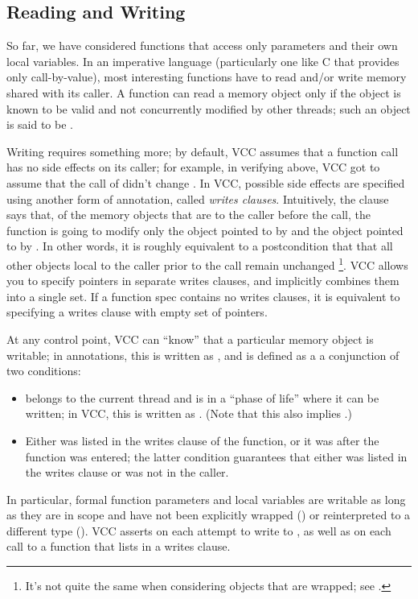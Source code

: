\subsection*{Reading and Writing}
\label{sect:writes}

So far, we have considered functions that access only parameters and
their own local variables. In an imperative language (particularly one
like C that provides only call-by-value), most interesting functions
have to read and/or write memory shared with its caller. A function
can read a memory object only if the object is known to be valid and
not concurrently modified by other threads; such an object is said to
be . 

Writing requires something more; by default, VCC assumes that a
function call has no side effects on its caller; for example, in
verifying  above, VCC got to assume that the call of
 didn't change . 
In VCC, possible side effects are specified using 
another form of annotation, called \emph{writes clauses}.
Intuitively, the clause  says that, 
of the memory objects that are  to the caller before the call,
the function is going to modify only the object pointed to by 
and the object pointed to by .
In other words, it is roughly equivalent to a postcondition that \vcc{\ensures}
that all other objects local to the caller prior
to the call remain unchanged%
\footnote{It's not quite the same when considering objects that are
  wrapped; see .}.  VCC allows you
to specify pointers in separate writes clauses, and implicitly
combines them into a single set. If a function spec contains no writes clauses, 
it is equivalent to specifying a writes clause with empty set of
pointers.

At any control point, VCC can ``know'' that a particular memory object
 is writable; in annotations, this is written as
, and is defined as a a conjunction of two conditions:
\begin{itemize}
\item {} belongs to the current thread and is in a ``phase of
  life'' where it can be written; in VCC, this is written as 
  . (Note that this also implies .)
\item Either  was listed in the writes clause of the function,
  or it was \vcc{\unwrapped} after the function was entered; the 
  latter condition guarantees that either  was listed in the
  writes clause or was not  in the caller.
\end{itemize}
In particular, formal function parameters and local variables are
writable as long as they are in scope and have not been explicitly
wrapped () or reinterpreted to a
different type ().  VCC asserts
 on each attempt to write to , as well as on
each call to a function that lists  in a writes clause.

